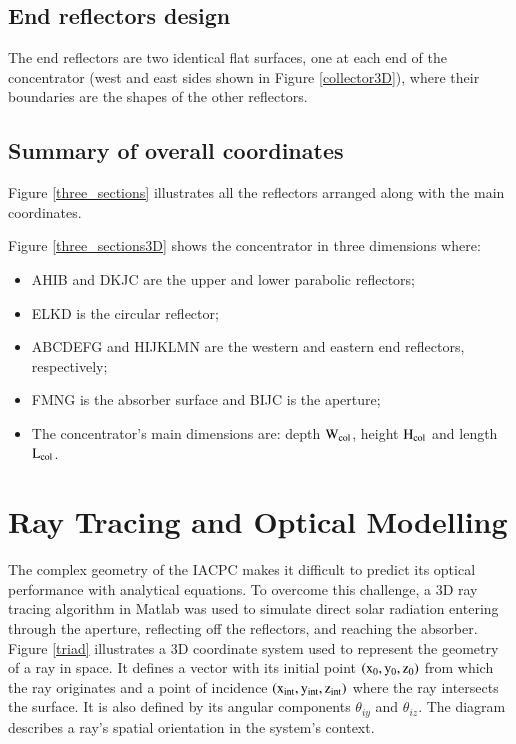 \subsection{End reflectors design}

The end reflectors are two identical flat surfaces, one at each end of the concentrator (west and east sides shown in Figure \ref{collector3D}), where their boundaries are the shapes of the other reflectors.

\subsection{Summary of overall coordinates}

Figure \ref{three_sections} illustrates all the reflectors arranged along with the main coordinates.


Figure \ref{three_sections3D} shows the concentrator in three dimensions where:

\begin{itemize}[topsep=5pt,partopsep=0pt] \itemsep0pt
\item AHIB and DKJC are the upper and lower parabolic reflectors;
\item ELKD is the circular reflector;
\item ABCDEFG and HIJKLMN are the western and eastern end reflectors, respectively;
\item FMNG is the absorber surface and BIJC is the aperture;
\item The concentrator’s main dimensions are: depth $\rm{W_{col}}$, height $\rm{H_{col}}$ and length $\rm{L_{col}}$.
\end{itemize}


\section{Ray Tracing and Optical Modelling}

The complex geometry of the IACPC makes it difficult to predict its optical performance with analytical equations. To overcome this challenge, a 3D ray tracing algorithm in Matlab was used to simulate direct solar radiation entering through the aperture, reflecting off the reflectors, and reaching the absorber. Figure \ref{triad} illustrates a 3D coordinate system used to represent the geometry of a ray in space. It defines a vector with its initial point $\rm{(x_0, y_0, z_0)}$ from which the ray originates and a point of incidence $\rm{(x_{\text{int}}, y_{\text{int}}, z_{\text{int}})}$ where the ray intersects the surface. It is also defined by its angular components  $\theta_{iy}$ and  $\theta_{iz}$. The diagram describes a ray's spatial orientation in the system's context.

